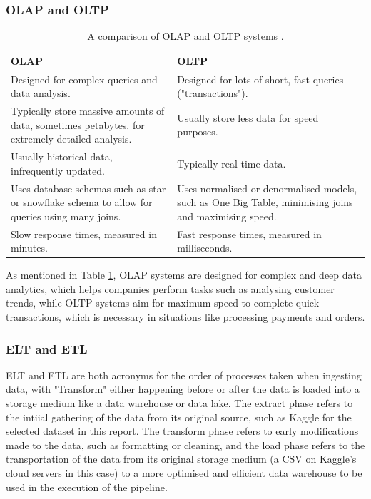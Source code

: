 \documentclass[12pt]{report}
\begin{document}
\subsubsection{OLAP and OLTP}

\begin{table}[H]
    \centering
        \begin{tabular}{ |p{}| p{}|}
            \hline
            \cellcolor{blue!25}OLAP & \cellcolor{blue!25}OLTP\\
            \hline
            Designed for complex queries and data analysis.
            & Designed for lots of short, fast queries ("transactions").\\
            \hline
            Typically store massive amounts of data, sometimes petabytes.
            for extremely detailed analysis. 
            & Usually store less data for speed purposes.\\
            \hline
            Usually historical data, infrequently updated. 
            & Typically real-time data.\\
            \hline 
            Uses database schemas such as star or snowflake schema to allow for queries using many joins. 
            & Uses normalised or denormalised models, such as One Big Table, minimising joins and maximising speed.\\
            \hline
            Slow response times, measured in minutes. 
            & Fast response times, measured in milliseconds.\\
            \hline
    \end{tabular}
    \caption{A comparison of OLAP and OLTP systems \autocite{aws_oltp_nodate}.}\label{tab:OLAP-OLTP}
\end{table}

As mentioned in Table \ref{tab:OLAP-OLTP}, OLAP systems are designed for complex and deep data analytics, which helps 
companies perform tasks such as analysing customer trends, while OLTP systems aim for maximum speed to complete quick transactions, 
which is necessary in situations like processing payments and orders.

\subsubsection{ELT and ETL}
ELT and ETL are both acronyms for the order of processes taken when ingesting data, with "Transform" either 
happening before or after the data is loaded into a storage medium like a data warehouse or data lake. 
The extract phase refers to the intiial gathering of the data from its original source, such as Kaggle for 
the selected dataset in this report. The transform phase refers to early modifications made to the data, such 
as formatting or cleaning, and the load phase refers to the transportation of the data from its original storage
medium (a CSV on Kaggle's cloud servers in this case) to a more optimised and efficient data warehouse to be used 
in the execution of the pipeline.
\end{document}

